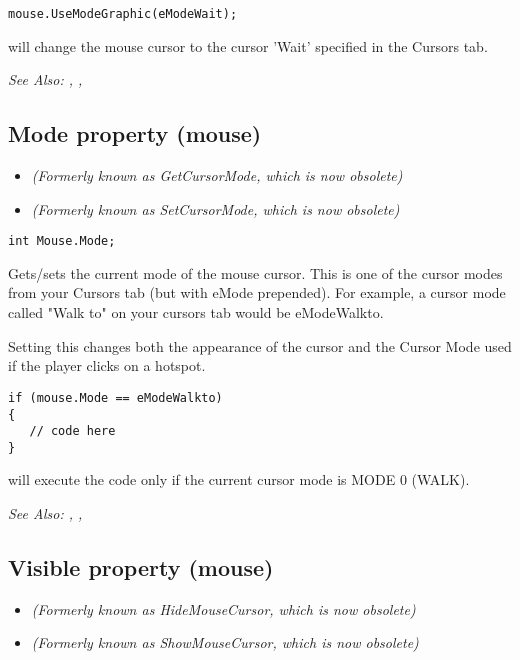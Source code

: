 \begin{verbatim}
mouse.UseModeGraphic(eModeWait);
\end{verbatim}
will change the mouse cursor to the cursor 'Wait' specified in the Cursors tab.

\it{See Also:} ,
, 


\subsection{Mode property (mouse)}\label{Mouse.Mode}%

\begin{itemize}
\item \it{(Formerly known as GetCursorMode, which is now obsolete)}
\item \it{(Formerly known as SetCursorMode, which is now obsolete)}
\end{itemize}

\begin{verbatim}
int Mouse.Mode;
\end{verbatim}
Gets/sets the current mode of the mouse cursor. This is one of the cursor modes
from your Cursors tab (but with eMode prepended). For example, a cursor mode called "Walk to"
on your cursors tab would be  eModeWalkto.

Setting this changes both the appearance of the cursor and the Cursor Mode
used if the player clicks on a hotspot.

\begin{verbatim}
if (mouse.Mode == eModeWalkto)
{
   // code here
}
\end{verbatim}
will execute the code only if the current cursor mode is MODE 0 (WALK).

\it{See Also:} ,
, 


\subsection{Visible property (mouse)}\label{Mouse.Visible}%

\begin{itemize}
\item \it{(Formerly known as HideMouseCursor, which is now obsolete)}
\item \it{(Formerly known as ShowMouseCursor, which is now obsolete)}
\end{itemize}

